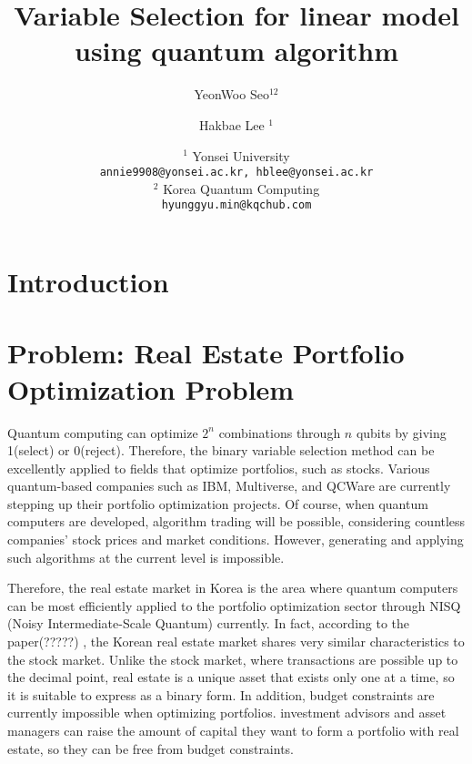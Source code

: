 \documentclass[a4paper]{article}
\title{Variable Selection for linear model using quantum algorithm}
\author{YeonWoo Seo$^{12}$ \and Hakbae Lee $^1$}
\date{
   $^1$ Yonsei University \\ \texttt{annie9908@yonsei.ac.kr, hblee@yonsei.ac.kr}\\%
   $^2$ Korea Quantum Computing \\ \texttt{hyunggyu.min@kqchub.com}
}
\theoremstyle{plain}
\theoremstyle{definition}
\begin{document}
   \maketitle
   
   \begin{abstract}

   \end{abstract}

   \tableofcontents

\section{Introduction}





\clearpage
\section{Problem: Real Estate Portfolio Optimization Problem}


Quantum computing can optimize $2^n$ combinations through $n$ qubits by giving 1(select) or 0(reject). Therefore, the binary variable selection method can be excellently applied to fields that optimize portfolios, such as stocks. Various quantum-based companies such as IBM, Multiverse, and QCWare are currently stepping up their portfolio optimization projects. Of course, when quantum computers are developed, algorithm trading will be possible, considering countless companies' stock prices and market conditions. However, generating and applying such algorithms at the current level is impossible.

Therefore, the real estate market in Korea is the area where quantum computers can be most efficiently applied to the portfolio optimization sector through NISQ (Noisy Intermediate-Scale Quantum) currently. In fact, according to the paper(?????) , the Korean real estate market shares very similar characteristics to the stock market. Unlike the stock market, where transactions are possible up to the decimal point, real estate is a unique asset that exists only one at a time, so it is suitable to express as a binary form. In addition, budget constraints are currently impossible when optimizing portfolios.  investment advisors and asset managers can raise the amount of capital they want to form a portfolio with real estate, so they can be free from budget constraints.
\end{document}
